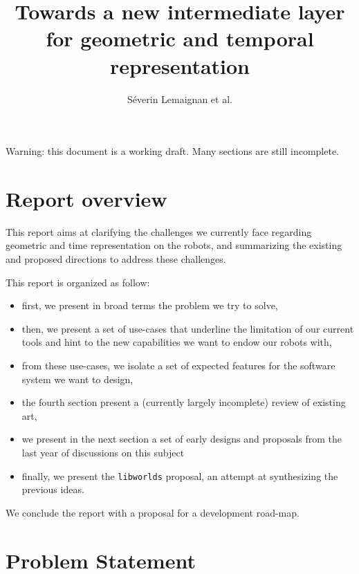 \documentclass[a4paper]{article}
\title{Towards a new intermediate layer for geometric and temporal representation}
\author{Séverin Lemaignan et al.}
\date{}
\begin{document}
\maketitle

{\color{red} Warning: this document is a working draft. Many sections are still incomplete.}

\section*{Report overview}

This report aims at clarifying the challenges we currently face regarding
geometric and time representation on the robots, and summarizing the
existing and proposed directions to address these challenges.

This report is organized as follow:

\begin{itemize}
    \item first, we present in broad terms the problem we try to solve,

    \item  then, we present a set of use-cases that underline the limitation of
        our current tools and hint to the new capabilities we want to endow our
        robots with,

    \item from these use-cases, we isolate a set of expected features for the
        software system we want to design,

    \item the fourth section present a (currently largely incomplete) review of
        existing art,

    \item we present in the next section a set of early designs and proposals
        from the last year of discussions on this subject

    \item finally, we present the {\tt libworlds} proposal, an attempt at synthesizing
        the previous ideas.

\end{itemize}

We conclude the report with a proposal for a development road-map.

\clearpage

\section{Problem Statement}
\label{problem-statement}%
\end{document}
